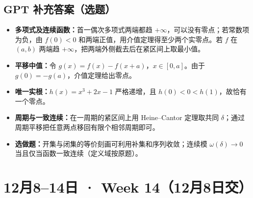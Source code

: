\documentclass[UTF8,11pt, a4paper, oneside, fontset=none]{ctexbook}
\begin{document}
\subsection*{GPT 补充答案（选题）}
\begin{itemize}
\item \textbf{多项式及连续函数：}首一偶次多项式两端都趋 $+\infty$，可以没有零点；若常数项为负，由 $f(0)<0$ 和两端正值，用介值定理得至少两个实零点。若 $f$ 在 $(a,b)$ 两端趋 $+\infty$，把两端外侧截去后在紧区间上取最小值。
\item \textbf{平移中值：}令 $g(x)=f(x)-f(x+a)$，$x\in[0,a]$。由于 $g(0)=-g(a)$，介值定理给出零点。
\item \textbf{唯一实根：}$h(x)=x^3+2x-1$ 严格递增，且 $h(0)<0<h(1)$，故恰有一个零点。
\item \textbf{周期与一致连续：}在一周期的紧区间上用 Heine--Cantor 定理取共同 $\delta$；通过周期平移把任意两点移回有限个相邻周期即可。
\item \textbf{选做题：}开集与闭集的等价刻画可利用补集和序列收敛；连续模 $\omega(\delta)\to0$ 当且仅当函数一致连续（定义域按原题）。
\end{itemize}
\clearpage
\section{12月8--14日 · Week 14（12月8日交）}
\end{document}
